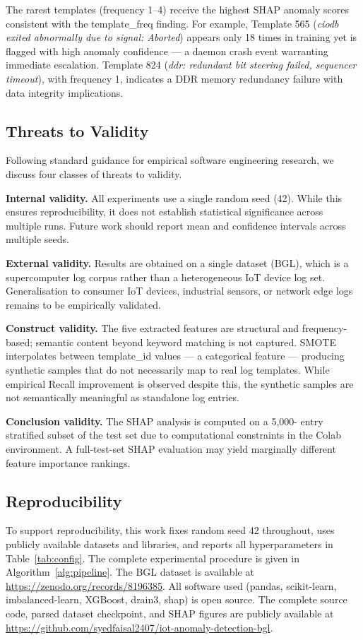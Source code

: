 \documentclass[conference]{IEEEtran}
\begin{document}
The rarest templates (frequency 1--4) receive the highest SHAP anomaly
scores consistent with the template\_freq finding. For example, Template
565 (\textit{ciodb exited abnormally due to signal: Aborted}) appears only
18 times in training yet is flagged with high anomaly confidence --- a
daemon crash event warranting immediate escalation. Template 824
(\textit{ddr: redundant bit steering failed, sequencer timeout}), with
frequency 1, indicates a DDR memory redundancy failure with data integrity
implications.

\subsection{Threats to Validity}

Following standard guidance for empirical software engineering research, we
discuss four classes of threats to validity.

\textbf{Internal validity.} All experiments use a single random seed (42).
While this ensures reproducibility, it does not establish statistical
significance across multiple runs. Future work should report mean and
confidence intervals across multiple seeds.

\textbf{External validity.} Results are obtained on a single dataset (BGL),
which is a supercomputer log corpus rather than a heterogeneous IoT device
log set. Generalisation to consumer IoT devices, industrial sensors, or
network edge logs remains to be empirically validated.

\textbf{Construct validity.} The five extracted features are structural and
frequency-based; semantic content beyond keyword matching is not captured.
SMOTE interpolates between template\_id values --- a categorical feature
--- producing synthetic samples that do not necessarily map to real log
templates. While empirical Recall improvement is observed despite this,
the synthetic samples are not semantically meaningful as standalone log
entries.

\textbf{Conclusion validity.} The SHAP analysis is computed on a 5{,}000-
entry stratified subset of the test set due to computational constraints
in the Colab environment. A full-test-set SHAP evaluation may yield
marginally different feature importance rankings.

\subsection{Reproducibility}

To support reproducibility, this work fixes random seed 42 throughout, uses
publicly available datasets and libraries, and reports all hyperparameters
in Table~\ref{tab:config}. The complete experimental procedure is given in
Algorithm~\ref{alg:pipeline}. The BGL dataset is available at
\url{https://zenodo.org/records/8196385}. All software used (pandas,
scikit-learn, imbalanced-learn, XGBoost, drain3, shap) is open source.
The complete source code, parsed dataset checkpoint, and SHAP figures are
publicly available at
\url{https://github.com/syedfaisal2407/iot-anomaly-detection-bgl}.
\end{document}
